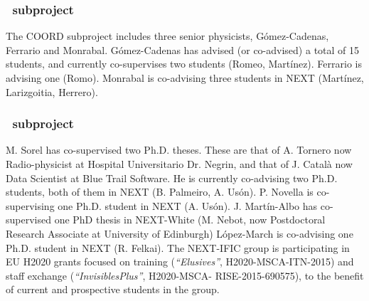 \subsubsection*{\sDIPC\ subproject}
The COORD subproject includes three senior physicists, G\'omez-Cadenas, Ferrario and Monrabal. G\'omez-Cadenas has advised (or co-advised) a total of 15 students, and currently co-supervises two students (Romeo, Mart\'inez).  Ferrario is advising one (Romo). Monrabal is co-advising three students in NEXT (Mart\'{i}nez, Larizgoitia, Herrero).


\subsubsection*{\sIFIC\ subproject}
M. Sorel has co-supervised two Ph.D. theses. These are that of
A. Tornero 
now Radio-physicist at Hospital
Universitario Dr. Negrin, and that of J. Catal\`a 
now Data Scientist at Blue Trail Software. He is currently co-advising two Ph.D. students, both of them in NEXT (B. Palmeiro, A. Us\'on). P. Novella is co-supervising one Ph.D. student in NEXT (A. Us\'on). J. Mart\'in-Albo has co-supervised one PhD thesis in NEXT-White (M. Nebot, 
now Postdoctoral Research Associate at University of Edinburgh) 
L\'opez-March is co-advising one Ph.D. student in NEXT (R. Felkai). The NEXT-IFIC group is participating in EU H2020 grants focused on training ({\it ``Elusives''}, H2020-MSCA-ITN-2015) and staff exchange ({\it ``InvisiblesPlus''}, H2020-MSCA- RISE-2015-690575), to the benefit of current and prospective students in the group.



